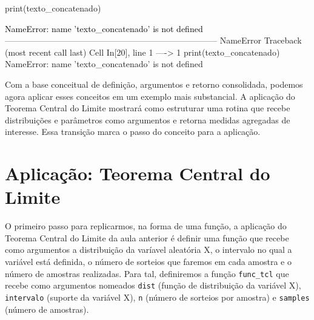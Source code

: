 \documentclass[
  brazilian,
  letterpaper,
  DIV=11,
  numbers=noendperiod]{scrreprt}
\newenvironment{Shaded}{\begin{snugshade}}{\end{snugshade}}
\newcommand{\BuiltInTok}[1]{\textcolor[rgb]{0.00,0.23,0.31}{#1}}
\newcommand{\NormalTok}[1]{\textcolor[rgb]{0.00,0.23,0.31}{#1}}
\begin{document}
\begin{Shaded}
\begin{Highlighting}[]
\BuiltInTok{print}\NormalTok{(texto\_concatenado)}
\end{Highlighting}
\end{Shaded}

\begin{Highlighting}
\textcolor{black}{NameError: name 'texto\_concatenado' is not defined}
\textcolor{black}{}\textcolor{QuartoInternalColor4}{---------------------------------------------------------------------------}\textcolor{QuartoInternalColor2}{}
\textcolor{QuartoInternalColor2}{}\textcolor{QuartoInternalColor4}{NameError}\textcolor{QuartoInternalColor2}{                                 Traceback (most recent call last)}
\textcolor{QuartoInternalColor2}{}\textcolor{QuartoInternalColor1}{Cell}\textcolor{QuartoInternalColor2}{}\textcolor{QuartoInternalColor1}{ }\textcolor{QuartoInternalColor2}{}\textcolor{QuartoInternalColor3}{In[20]}\textcolor{QuartoInternalColor2}{}\textcolor{QuartoInternalColor3}{, line 1}\textcolor{QuartoInternalColor2}{}
\textcolor{QuartoInternalColor2}{}\textcolor{QuartoInternalColor3}{----> }\textcolor{QuartoInternalColor2}{}\textcolor{QuartoInternalColor3}{1}\textcolor{QuartoInternalColor2}{ }\textcolor{QuartoInternalColor7}{print}\textcolor{QuartoInternalColor2}{(}\textcolor{QuartoInternalColor2}{texto\_concatenado}\textcolor{QuartoInternalColor2}{)}
\textcolor{QuartoInternalColor2}{}\textcolor{QuartoInternalColor4}{NameError}\textcolor{QuartoInternalColor2}{: name 'texto\_concatenado' is not defined}
\end{Highlighting}

Com a base conceitual de definição, argumentos e retorno consolidada,
podemos agora aplicar esses conceitos em um exemplo mais substancial. A
aplicação do Teorema Central do Limite mostrará como estruturar uma
rotina que recebe distribuições e parâmetros como argumentos e retorna
medidas agregadas de interesse. Essa transição marca o passo do conceito
para a aplicação.

\section{Aplicação: Teorema Central do
Limite}\label{aplicauxe7uxe3o-teorema-central-do-limite-1}

O primeiro passo para replicarmos, na forma de uma função, a aplicação
do Teorema Central do Limite da aula anterior é definir uma função que
recebe como argumentos a distribuição da varíavel aleatória X, o
intervalo no qual a variável está definida, o número de sorteios que
faremos em cada amostra e o número de amostras realizadas. Para tal,
definiremos a função \texttt{func\_tcl} que recebe como argumentos
nomeados \texttt{dist} (função de distribuição da variável X),
\texttt{intervalo} (suporte da variável X), \texttt{n} (número de
sorteios por amostra) e \texttt{samples} (número de amostras).
\end{document}

